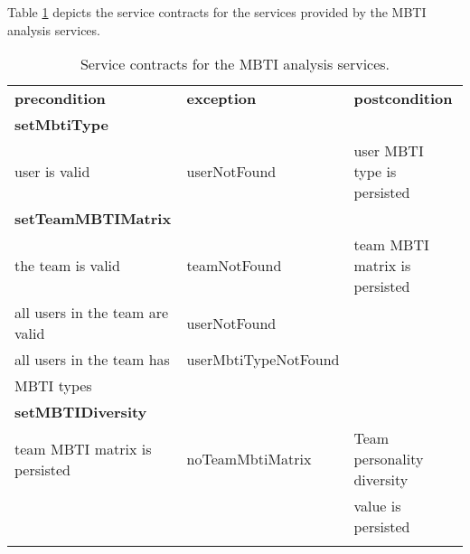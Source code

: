 Table \ref{tab:mbti_serviceContract} depicts the service contracts for the services provided by the MBTI analysis services.

\begin{table}[htb]
\caption{Service contracts for the MBTI analysis services. \label{tab:mbti_serviceContract}}

\begin{tabular}{l l l}
\hline
\noalign{\smallskip}
\textbf{precondition}&\textbf{exception} &\textbf{postcondition}\\
\noalign{\smallskip}
\hline
\noalign{\smallskip}

\textbf{setMbtiType}\\
user is valid & userNotFound& user MBTI type is persisted\\
\noalign{\smallskip}
\textbf{setTeamMBTIMatrix} \\
the team is valid & teamNotFound & team MBTI matrix is persisted \\
all users in the team are valid & userNotFound\\
all users in the team has & userMbtiTypeNotFound\\
MBTI types \\
\noalign{\smallskip}
\textbf{setMBTIDiversity}\\
team MBTI matrix is persisted & noTeamMbtiMatrix & Team personality diversity \\
&& value is persisted\\
\noalign{\smallskip}
\hline
\end{tabular}  
\end{table}
 